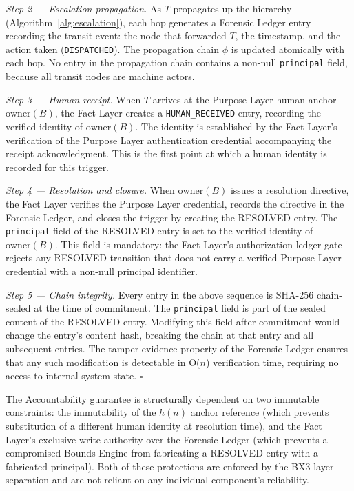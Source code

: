 \medskip

\noindent\textit{Step 2 — Escalation propagation.} As $T$ propagates up the hierarchy (Algorithm~\ref{alg:escalation}), each hop generates a Forensic Ledger entry recording the transit event: the node that forwarded $T$, the timestamp, and the action taken (\texttt{DISPATCHED}). The propagation chain $\phi$ is updated atomically with each hop. No entry in the propagation chain contains a non-null \texttt{principal} field, because all transit nodes are machine actors.

\medskip

\noindent\textit{Step 3 — Human receipt.} When $T$ arrives at the Purpose Layer human anchor $\text{owner}(B)$, the Fact Layer creates a \texttt{HUMAN\_RECEIVED} entry, recording the verified identity of $\text{owner}(B)$. The identity is established by the Fact Layer's verification of the Purpose Layer authentication credential accompanying the receipt acknowledgment. This is the first point at which a human identity is recorded for this trigger.

\medskip

\noindent\textit{Step 4 — Resolution and closure.} When $\text{owner}(B)$ issues a resolution directive, the Fact Layer verifies the Purpose Layer credential, records the directive in the Forensic Ledger, and closes the trigger by creating the RESOLVED entry. The \texttt{principal} field of the RESOLVED entry is set to the verified identity of $\text{owner}(B)$. This field is mandatory: the Fact Layer's authorization ledger gate rejects any RESOLVED transition that does not carry a verified Purpose Layer credential with a non-null principal identifier.

\medskip

\noindent\textit{Step 5 — Chain integrity.} Every entry in the above sequence is SHA-256 chain-sealed at the time of commitment. The \texttt{principal} field is part of the sealed content of the RESOLVED entry. Modifying this field after commitment would change the entry's content hash, breaking the chain at that entry and all subsequent entries. The tamper-evidence property of the Forensic Ledger ensures that any such modification is detectable in O($n$) verification time, requiring no access to internal system state. $\square$

\bigskip

The Accountability guarantee is structurally dependent on two immutable constraints: the immutability of the $h(n)$ anchor reference (which prevents substitution of a different human identity at resolution time), and the Fact Layer's exclusive write authority over the Forensic Ledger (which prevents a compromised Bounds Engine from fabricating a RESOLVED entry with a fabricated principal). Both of these protections are enforced by the BX3 layer separation and are not reliant on any individual component's reliability.

